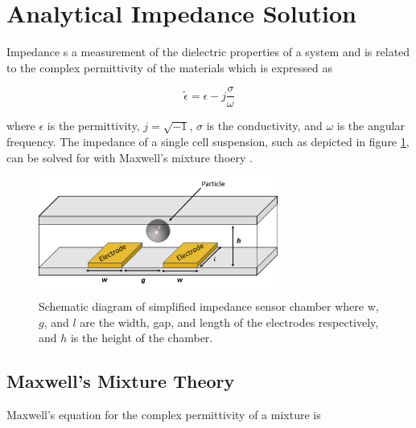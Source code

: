 
\section{Analytical Impedance Solution} \label{sec: analytical_impedance_solution}

\par Impedance s a measurement of the dielectric properties of a system and is related to the complex permittivity of the materials which is expressed as

\begin{equation}
    \tilde{\epsilon} = \epsilon - j\frac{\sigma}{\omega}
\end{equation}

\noindent where $\epsilon$ is the permittivity, $j = \sqrt{-1}$, $\sigma$ is the conductivity, and $\omega$ is the angular frequency. The impedance of a single cell suspension, such as depicted in figure \ref{fig:simplified_IS}, can be solved for with Maxwell's mixture thoery \cite{james_clerk_maxwell_treatise_1892, sun_single-cell_2010}.

\begin{figure}[ht]
 \centering
 \includegraphics[width=0.7\textwidth]{images/cellAndElectrodes.png}
 \caption[Schematic diagram of simplified impedance sensor chamber.]{Schematic diagram of simplified impedance sensor chamber where w, $g$, and $l$ are the width, gap, and length of the electrodes respectively, and $h$ is the height of the chamber.}
 \label{fig:simplified_IS}
 \end{figure}
 
 

\subsection{Maxwell's Mixture Theory}
 
 Maxwell's equation for the complex permittivity of a mixture is
  
